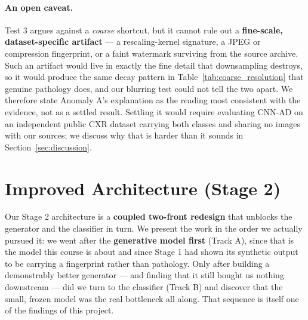 \documentclass[11pt]{article}
\begin{document}
\paragraph{An open caveat.} Test 3 argues against a \emph{coarse} shortcut, but it cannot rule out a \textbf{fine-scale, dataset-specific artifact} --- a rescaling-kernel signature, a JPEG or compression fingerprint, or a faint watermark surviving from the source archive. Such an artifact would live in exactly the fine detail that downsampling destroys, so it would produce the same decay pattern in Table~\ref{tab:coarse_resolution} that genuine pathology does, and our blurring test could not tell the two apart. We therefore state Anomaly A's explanation as the reading most consistent with the evidence, not as a settled result. Settling it would require evaluating CNN-AD on an independent public CXR dataset carrying both classes and sharing no images with our sources; we discuss why that is harder than it sounds in Section~\ref{sec:discussion}.

\section{Improved Architecture (Stage 2)} \label{sec:improved_architecture}
Our Stage 2 architecture is a \textbf{coupled two-front redesign} that unblocks the generator and the classifier in turn. We present the work in the order we actually pursued it: we went after the \textbf{generative model first} (Track A), since that is the model this course is about and since Stage 1 had shown its synthetic output to be carrying a fingerprint rather than pathology. Only after building a demonstrably better generator --- and finding that it still bought us nothing downstream --- did we turn to the classifier (Track B) and discover that the small, frozen model was the real bottleneck all along. That sequence is itself one of the findings of this project.
\end{document}
